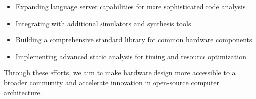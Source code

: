 \documentclass[conference]{IEEEtran}
\begin{document}
\begin{itemize}
    \item Expanding language server capabilities for more sophisticated code analysis
    \item Integrating with additional simulators and synthesis tools
    \item Building a comprehensive standard library for common hardware components
    \item Implementing advanced static analysis for timing and resource optimization
\end{itemize}

Through these efforts, we aim to make hardware design more accessible to a
broader community and accelerate innovation in open-source computer
architecture.

\balance 


\end{document}

